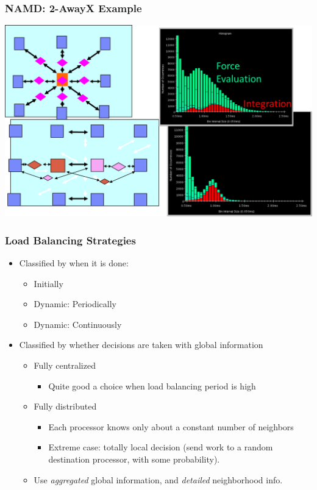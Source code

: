 \begin{frame}[fragile]
\frametitle{NAMD: 2-AwayX Example}
\begin{centering}
\includegraphics[width=1.0\textwidth]{figures/2awayDiagramPlusHistos}
\end{centering}
\end{frame}

\begin{frame}[fragile]
\frametitle{Load Balancing Strategies}
\begin{itemize}
 \item Classified by when it is done:
 \begin{itemize}
  \item Initially
  \item Dynamic: Periodically
  \item Dynamic: Continuously
 \end{itemize}
 \item Classified by whether decisions are taken with global information
 \begin{itemize}
  \item Fully centralized
  \begin{itemize}
   \item Quite good a choice when load balancing period is high
  \end{itemize}
 \item Fully distributed
 \begin{itemize}
  \item Each processor knows only about a constant number of neighbors
  \item Extreme case: totally local decision (send work to a random destination processor, with some probability).
 \end{itemize}
\item Use \emph{aggregated} global  information, and \emph{detailed} neighborhood info.
\end{itemize}
\end{itemize}
\end{frame}


